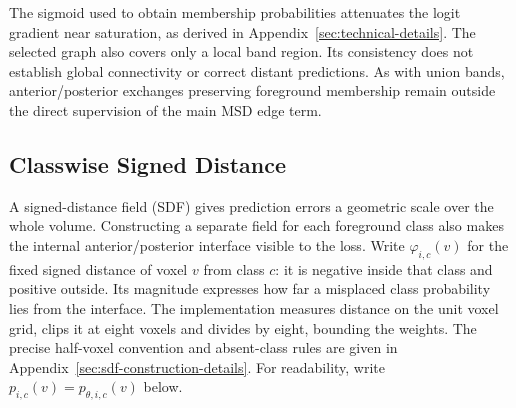 \documentclass[12pt,a4paper]{article}
\begin{document}
The sigmoid used to obtain membership probabilities attenuates the
logit gradient near saturation, as derived in
Appendix~\ref{sec:technical-details}. The selected graph also covers
only a local band region. Its consistency does not establish global
connectivity or correct distant predictions. As with union bands,
anterior/posterior exchanges preserving foreground membership remain
outside the direct supervision of the main MSD edge term.

\subsection{Classwise Signed Distance}\label{sec:sdf-constraints}

A signed-distance field (SDF) gives prediction errors a geometric scale over the whole
volume. Constructing a separate field for each foreground class also
makes the internal anterior/posterior interface visible to the loss.
Write $\varphi_{i,c}(v)$ for the fixed signed distance of voxel $v$
from class $c$: it is negative inside that class and positive outside.
Its magnitude expresses how far a misplaced class probability lies from
the interface. The implementation measures distance on the unit voxel
grid, clips it at eight voxels and divides by eight, bounding the
weights. The precise half-voxel convention and absent-class rules are
given in Appendix~\ref{sec:sdf-construction-details}. For readability,
write $p_{i,c}(v)=p_{\theta,i,c}(v)$ below.
\end{document}
